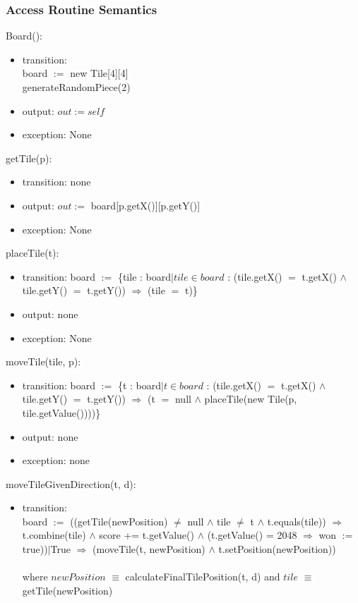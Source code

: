\documentclass[12pt]{article}
\begin{document}
\subsubsection* {Access Routine Semantics}

Board():
\begin{itemize}
\item transition: \\
      board $:=$ new Tile[4][4]\\
      generateRandomPiece(2)
\item output: $out := \mathit{self}$
\item exception: None
\end{itemize}

\noindent getTile(p):
\begin{itemize}
\item transition: none
\item output: $out :=$ board[p.getX()][p.getY()]
\item exception: None
\end{itemize}

\noindent placeTile(t):
\begin{itemize}
\item transition: board $:=$ \{tile : board$|$$tile \in board$ : (tile.getX() $=$ t.getX() $\land$ tile.getY() $=$ t.getY()) $\Rightarrow$ (tile $=$ t)\}
\item output: none
\item exception: None
\end{itemize}

\noindent moveTile(tile, p):
\begin{itemize}
\item transition: board $:=$ \{t : board$|$$t \in board$ : (tile.getX() $=$ t.getX() $\land$ tile.getY() $=$ t.getY()) $\Rightarrow$ (t $=$ null $\land$ placeTile(new Tile(p, tile.getValue())))\}
\item output: none
\item exception: none
\end{itemize}

\noindent moveTileGivenDirection(t, d):
\begin{itemize}
\item transition:\\ board $:=$ ((getTile(newPosition) $\neq$ null $\land$ tile $\neq$ t $\land$ t.equals(tile)) $\Rightarrow$ t.combine(tile) $\land$ score += t.getValue() $\land$ (t.getValue() = 2048 $\Rightarrow$ won $:=$ true))$|$True $\Rightarrow$ (moveTile(t, newPosition) $\land$ t.setPosition(newPosition))\\\\
where $newPosition$ $\equiv$ calculateFinalTilePosition(t, d) and $tile$ $\equiv$ getTile(newPosition)
\end{itemize}
\end{document}
